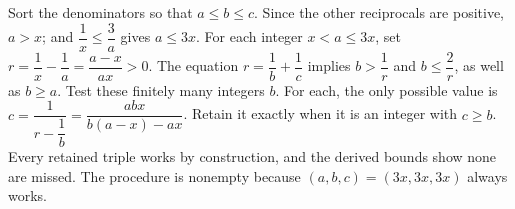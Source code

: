 Sort the denominators so that $a\le b\le c$. Since the other reciprocals are positive, $a>x$; and $\dfrac{1}{x}\le\dfrac{3}{a}$ gives $a\le3x$. For each integer $x<a\le3x$, set $r=\dfrac{1}{x}-\dfrac{1}{a}=\dfrac{a-x}{ax}>0$. The equation $r=\dfrac{1}{b}+\dfrac{1}{c}$ implies $b>\dfrac{1}{r}$ and $b\le\dfrac{2}{r}$, as well as $b\ge a$. Test these finitely many integers $b$. For each, the only possible value is $c=\dfrac{1}{r-\dfrac{1}{b}}=\dfrac{abx}{b(a-x)-ax}$. Retain it exactly when it is an integer with $c\ge b$. Every retained triple works by construction, and the derived bounds show none are missed. The procedure is nonempty because $(a,b,c)=(3x,3x,3x)$ always works.
